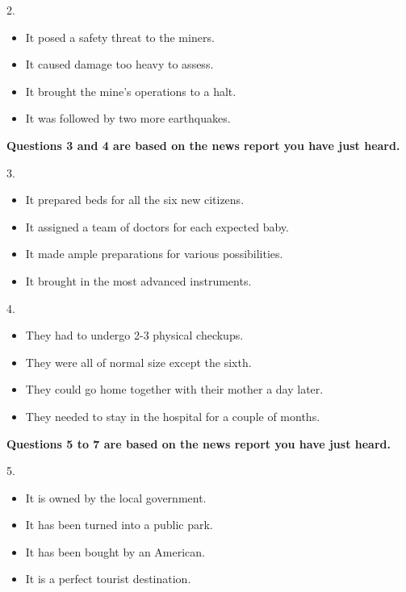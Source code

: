\documentclass[UTF8,11pt]{ctexart}
\begin{document}
2.


\begin{itemize}[leftmargin=2em,itemsep=.2em,topsep=.4em]\item[A.] It posed a safety threat to the miners.
\item[B.] It caused damage too heavy to assess.
\item[C.] It brought the mine's operations to a halt.
\item[D.] It was followed by two more earthquakes.
\end{itemize}

\textbf{Questions 3 and 4 are based on the news report you have just heard.}


3.


\begin{itemize}[leftmargin=2em,itemsep=.2em,topsep=.4em]\item[A.] It prepared beds for all the six new citizens.
\item[B.] It assigned a team of doctors for each expected baby.
\item[C.] It made ample preparations for various possibilities.
\item[D.] It brought in the most advanced instruments.
\end{itemize}

4.


\begin{itemize}[leftmargin=2em,itemsep=.2em,topsep=.4em]\item[A.] They had to undergo 2-3 physical checkups.
\item[B.] They were all of normal size except the sixth.
\item[C.] They could go home together with their mother a day later.
\item[D.] They needed to stay in the hospital for a couple of months.
\end{itemize}

\textbf{Questions 5 to 7 are based on the news report you have just heard.}


5.


\begin{itemize}[leftmargin=2em,itemsep=.2em,topsep=.4em]\item[A.] It is owned by the local government.
\item[B.] It has been turned into a public park.
\item[C.] It has been bought by an American.
\item[D.] It is a perfect tourist destination.
\end{itemize}
\end{document}
